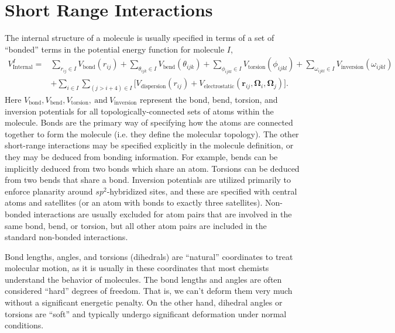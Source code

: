 \documentclass[letterpaper]{report}
\begin{document}
\section{\label{section::ffShortRange}Short Range Interactions}
The internal structure of a molecule is usually specified in terms of
a set of ``bonded'' terms in the potential energy function for
molecule $I$,
\begin{align*}
 V^{I}_{\text{Internal}} =  &
 \sum_{r_{ij} \in I} V_{\text{bond}}(r_{ij})
 + \sum_{\theta_{ijk} \in I} V_{\text{bend}}(\theta_{ijk})
 + \sum_{\phi_{ijkl} \in I} V_{\text{torsion}}(\phi_{ijkl})
 + \sum_{\omega_{ijkl} \in I} V_{\text{inversion}}(\omega_{ijkl}) \\
 & + \sum_{i \in I} \sum_{(j>i+4) \in I} 
 \biggl[ V_{\text{dispersion}}(r_{ij}) +  V_{\text{electrostatic}}
 (\mathbf{r}_{ij},\boldsymbol{\Omega}_{i},\boldsymbol{\Omega}_{j})
 \biggr].
\label{eq:internalPotential}
\end{align*}
Here $V_{\text{bond}}, V_{\text{bend}},
V_{\text{torsion}},\mathrm{~and~} V_{\text{inversion}}$ represent the
bond, bend, torsion, and inversion potentials for all
topologically-connected sets of atoms within the molecule.  Bonds are
the primary way of specifying how the atoms are connected together to
form the molecule (i.e. they define the molecular topology).  The
other short-range interactions may be specified explicitly in the
molecule definition, or they may be deduced from bonding information.
For example, bends can be implicitly deduced from two bonds which
share an atom.  Torsions can be deduced from two bends that share a
bond.  Inversion potentials are utilized primarily to enforce
planarity around $sp^2$-hybridized sites, and these are specified with
central atoms and satellites (or an atom with bonds to exactly three
satellites). Non-bonded interactions are usually excluded for atom
pairs that are involved in the same bond, bend, or torsion, but all
other atom pairs are included in the standard non-bonded interactions.

Bond lengths, angles, and torsions (dihedrals) are ``natural''
coordinates to treat molecular motion, as it is usually in these
coordinates that most chemists understand the behavior of molecules.
The bond lengths and angles are often considered ``hard'' degrees of
freedom.  That is, we can't deform them very much without a
significant energetic penalty.  On the other hand, dihedral angles or
torsions are ``soft'' and typically undergo significant deformation
under normal conditions.
\end{document}
